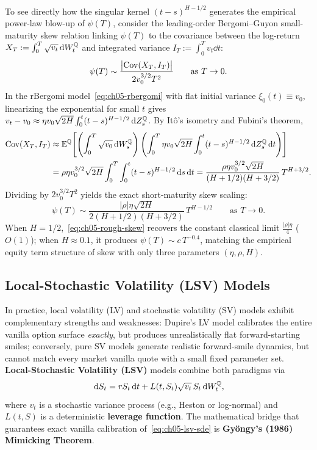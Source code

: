 To see directly how the singular kernel $(t - s)^{H - 1/2}$ generates the empirical power-law blow-up of $\psi(T)$, consider the leading-order Bergomi--Guyon small-maturity skew relation linking $\psi(T)$ to the covariance between the log-return $X_T := \int_0^T \sqrt{v_t}\,\mathrm{d} W_t^{\mathbb{Q}}$ and integrated variance $I_T := \int_0^T v_t \dd t$:
\[
    \psi(T) \sim \frac{\bigl|\operatorname{Cov}(X_T, I_T)\bigr|}{2 v_0^{3/2} T^2} \qquad \text{as } T \to 0.
\]
In the rBergomi model~\eqref{eq:ch05-rbergomi} with flat initial variance $\xi_0(t) \equiv v_0$, linearizing the exponential for small $t$ gives $v_t - v_0 \approx \eta v_0 \sqrt{2H}\int_0^t (t - s)^{H - 1/2}\,\mathrm{d} Z_s^{\mathbb{Q}}$. By It\^o's isometry and Fubini's theorem,
\begin{align*}
    \operatorname{Cov}(X_T, I_T)
    &\approx \mathbb{E}^{\mathbb{Q}}\!\left[\left(\int_0^T \sqrt{v_0}\,\mathrm{d} W_s^{\mathbb{Q}}\right)\left(\int_0^T \eta v_0\sqrt{2H}\int_0^t (t - s)^{H - 1/2}\,\mathrm{d} Z_s^{\mathbb{Q}}\,\mathrm{d} t\right)\right] \\
    &= \rho\eta v_0^{3/2}\sqrt{2H}\int_0^T \int_0^t (t - s)^{H - 1/2}\,\mathrm{d} s \,\mathrm{d} t
    = \frac{\rho\eta v_0^{3/2}\sqrt{2H}}{(H + 1/2)(H + 3/2)}\,T^{H + 3/2}.
\end{align*}
Dividing by $2 v_0^{3/2} T^2$ yields the exact short-maturity skew scaling:
\begin{equation}
    \label{eq:ch05-rough-skew}
    \psi(T) \sim \frac{|\rho|\eta\sqrt{2H}}{2(H + 1/2)(H + 3/2)}\,T^{H - 1/2} \qquad \text{as } T \to 0.
\end{equation}
When $H = 1/2$,~\eqref{eq:ch05-rough-skew} recovers the constant classical limit $\frac{|\rho|\eta}{4}$ ($O(1)$); when $H \approx 0.1$, it produces $\psi(T) \sim c\,T^{-0.4}$, matching the empirical equity term structure of skew with only three parameters $(\eta, \rho, H)$.

\subsection{Local-Stochastic Volatility (LSV) Models}
\label{sec:ch05-lsv}
In practice, local volatility (LV) and stochastic volatility (SV) models exhibit complementary strengths and weaknesses: Dupire's LV model calibrates the entire vanilla option surface \emph{exactly}, but produces unrealistically flat forward-starting smiles; conversely, pure SV models generate realistic forward-smile dynamics, but cannot match every market vanilla quote with a small fixed parameter set. \textbf{Local-Stochastic Volatility (LSV)} models combine both paradigms via
\begin{equation}
    \label{eq:ch05-lsv-sde}
    \,\mathrm{d} S_t = r S_t \,\mathrm{d} t + L(t, S_t)\sqrt{v_t}\,S_t \,\mathrm{d} W_t^{\mathbb{Q}},
\end{equation}
where $v_t$ is a stochastic variance process (e.g., Heston or log-normal) and $L(t, S)$ is a deterministic \textbf{leverage function}. The mathematical bridge that guarantees exact vanilla calibration of~\eqref{eq:ch05-lsv-sde} is \textbf{Gy\"ongy's (1986) Mimicking Theorem}.

